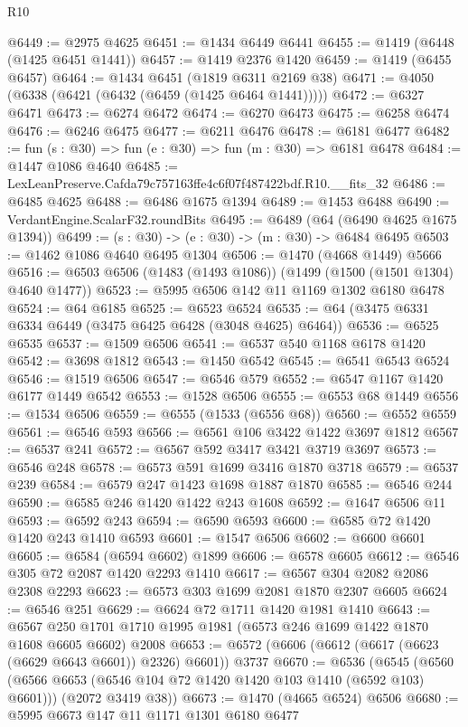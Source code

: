 \begin{lexlean}{R10}
\begin{coremodule}
@6449 := @2975 @4625
@6451 := @1434 @6449 @6441
@6455 := @1419 (@6448 (@1425 @6451 @1441))
@6457 := @1419 @2376 @1420
@6459 := @1419 (@6455 @6457)
@6464 := @1434 @6451 (@1819 @6311 @2169 @38)
@6471 := @4050 (@6338 (@6421 (@6432 (@6459 (@1425 @6464 @1441)))))
@6472 := @6327 @6471
@6473 := @6274 @6472
@6474 := @6270 @6473
@6475 := @6258 @6474
@6476 := @6246 @6475
@6477 := @6211 @6476
@6478 := @6181 @6477
@6482 := fun (s : @30) => fun (e : @30) => fun (m : @30) => @6181 @6478
@6484 := @1447 @1086 @4640
@6485 := LexLeanPreserve.Cafda79c757163ffe4c6f07f487422bdf.R10.__fits_32
@6486 := @6485 @4625
@6488 := @6486 @1675 @1394
@6489 := @1453 @6488
@6490 := VerdantEngine.ScalarF32.roundBits
@6495 := @6489 (@64 (@6490 @4625 @1675 @1394))
@6499 := (s : @30) -> (e : @30) -> (m : @30) -> @6484 @6495
@6503 := @1462 @1086 @4640 @6495 @1304
@6506 := @1470 (@4668 @1449) @5666
@6516 := @6503 @6506 (@1483 (@1493 @1086)) (@1499 (@1500 (@1501 @1304) @4640 @1477))
@6523 := @5995 @6506 @142 @11 @1169 @1302 @6180 @6478
@6524 := @64 @6185
@6525 := @6523 @6524
@6535 := @64 (@3475 @6331 @6334 @6449 (@3475 @6425 @6428 (@3048 @4625) @6464))
@6536 := @6525 @6535
@6537 := @1509 @6506
@6541 := @6537 @540 @1168 @6178 @1420
@6542 := @3698 @1812
@6543 := @1450 @6542
@6545 := @6541 @6543 @6524
@6546 := @1519 @6506
@6547 := @6546 @579
@6552 := @6547 @1167 @1420 @6177 @1449 @6542
@6553 := @1528 @6506
@6555 := @6553 @68 @1449
@6556 := @1534 @6506
@6559 := @6555 (@1533 (@6556 @68))
@6560 := @6552 @6559
@6561 := @6546 @593
@6566 := @6561 @106 @3422 @1422 @3697 @1812
@6567 := @6537 @241
@6572 := @6567 @592 @3417 @3421 @3719 @3697
@6573 := @6546 @248
@6578 := @6573 @591 @1699 @3416 @1870 @3718
@6579 := @6537 @239
@6584 := @6579 @247 @1423 @1698 @1887 @1870
@6585 := @6546 @244
@6590 := @6585 @246 @1420 @1422 @243 @1608
@6592 := @1647 @6506 @11
@6593 := @6592 @243
@6594 := @6590 @6593
@6600 := @6585 @72 @1420 @1420 @243 @1410 @6593
@6601 := @1547 @6506
@6602 := @6600 @6601
@6605 := @6584 (@6594 @6602) @1899
@6606 := @6578 @6605
@6612 := @6546 @305 @72 @2087 @1420 @2293 @1410
@6617 := @6567 @304 @2082 @2086 @2308 @2293
@6623 := @6573 @303 @1699 @2081 @1870 @2307 @6605
@6624 := @6546 @251
@6629 := @6624 @72 @1711 @1420 @1981 @1410
@6643 := @6567 @250 @1701 @1710 @1995 @1981 (@6573 @246 @1699 @1422 @1870 @1608 @6605 @6602) @2008
@6653 := @6572 (@6606 (@6612 (@6617 (@6623 (@6629 @6643 @6601)) @2326) @6601)) @3737
@6670 := @6536
    (@6545
      (@6560 (@6566 @6653 (@6546 @104 @72 @1420 @1420 @103 @1410 (@6592 @103) @6601)))
      (@2072 @3419 @38))
@6673 := @1470 (@4665 @6524) @6506
@6680 := @5995 @6673 @147 @11 @1171 @1301 @6180 @6477

\end{coremodule}
\end{lexlean}
